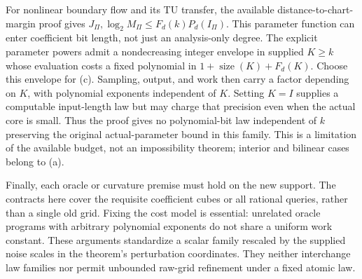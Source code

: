 For nonlinear boundary flow and its TU transfer, the available
distance-to-chart-margin proof gives
$J_\Pi,\log_2M_\Pi\le F_d(k)P_d(I_\Pi)$. This parameter function
can enter coefficient bit length, not just an analysis-only degree.
The explicit parameter powers admit a nondecreasing integer envelope in
supplied $K\ge k$ whose evaluation costs a fixed polynomial in
$1+\operatorname{size}(K)+F_d(K)$. Choose this envelope for (c).
Sampling, output, and work then carry a factor depending on $K$, with
polynomial exponents independent of $K$. Setting $K=I$ supplies a
computable input-length law but may charge that precision even when the
actual core is small. Thus the proof gives no polynomial-bit law
independent of $k$ preserving the original actual-parameter bound in
this family. This is a limitation of the available budget, not an
impossibility theorem; interior and bilinear cases belong to (a).

Finally, each oracle or curvature premise must hold on the new support.
The contracts here cover the requisite coefficient cubes or all rational
queries, rather than a single old grid. Fixing the cost model is
essential: unrelated oracle programs with arbitrary polynomial exponents
do not share a uniform work constant. These arguments standardize a
scalar family rescaled by the supplied noise scales in the theorem's
perturbation coordinates. They neither interchange law families nor
permit unbounded raw-grid refinement under a fixed atomic law.
